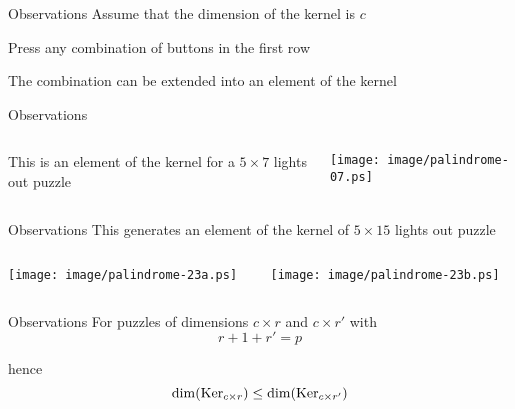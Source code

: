 \begin{frame}{Observations}
	Assume that the dimension of the kernel is $c$
	
	\bigskip
	
	Press any combination of buttons in the first row
	
	\bigskip
	
	The combination can be extended into an element of the kernel
\end{frame}

\begin{frame}{Observations}
	\begin{columns}
		\begin{column}{0.45\textwidth}
			This is an element of the kernel for a $5 \times 7$ lights out
			puzzle
		\end{column}
		\begin{column}{0.45\textwidth}
			\begin{center}
				\texttt{[image: image/palindrome-07.ps]}
			\end{center}
		\end{column}
	\end{columns}
\end{frame}

\begin{frame}{Observations}
	This generates an element of the kernel of $5 \times 15$ lights out puzzle
	\begin{columns}
		\begin{column}{0.45\textwidth}
			\begin{center}
				\texttt{[image: image/palindrome-23a.ps]}
			\end{center}
		\end{column}
		\begin{column}{0.45\textwidth}
			\begin{center}
				\texttt{[image: image/palindrome-23b.ps]}
			\end{center}
		\end{column}
	\end{columns}
\end{frame}

\begin{frame}{Observations}
	For puzzles of dimensions $c \times r$ and $c \times r'$ with
	\[
		r + 1 + r' = p
	\]
	
	\bigskip
	\pause
	
	hence
	\[
		\dim(\operatorname{Ker}_{c \times r}) \le \dim(\operatorname{Ker}_{c \times r'})
	\]
\end{frame}
